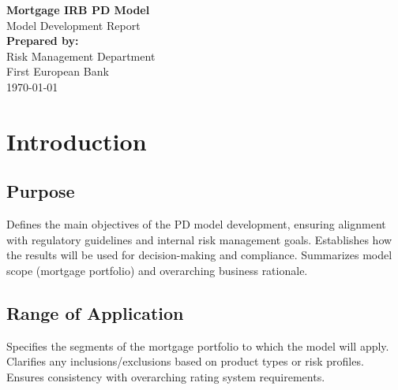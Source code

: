 \documentclass[12pt,a4paper]{article}
\begin{document}
\begin{titlepage}
  \hypersetup{pageanchor=false}
  \thispagestyle{empty}
  \begin{center}
    \vspace*{3cm}
    {\Huge \textbf{Mortgage IRB PD Model}}\\[0.5cm]
    {\Large Model Development Report}\\[5cm]

    \textbf{Prepared by:}\\
    Risk Management Department \\
    First European Bank \\
    \vfill
    \today
  \end{center}
\end{titlepage}

\hypersetup{pageanchor=true}
\pagestyle{plain}         %
\tableofcontents
\clearpage


\pagestyle{fancy}
\fancyhf{}                        %
\fancyfoot[R]{\thepage}
\renewcommand{\headrulewidth}{0pt}
\renewcommand{\footrulewidth}{0pt}

\onehalfspacing

\section{Introduction}

\subsection{Purpose}
Defines the main objectives of the PD model development, ensuring alignment with regulatory guidelines and internal risk management goals. Establishes how the results will be used for decision-making and compliance. Summarizes model scope (mortgage portfolio) and overarching business rationale.

\subsection{Range of Application}
Specifies the segments of the mortgage portfolio to which the model will apply. Clarifies any inclusions/exclusions based on product types or risk profiles. Ensures consistency with overarching rating system requirements.
\end{document}
